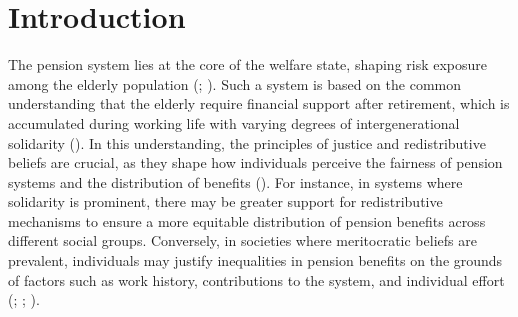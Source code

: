 \documentclass[
  12pt,
]{article}
\begin{document}
\section{Introduction}\label{introduction}

The pension system lies at the core of the welfare state, shaping risk
exposure among the elderly population
(;
). Such
a system is based on the common understanding that the elderly require
financial support after retirement, which is accumulated during working
life with varying degrees of intergenerational solidarity
(). In this understanding,
the principles of justice and redistributive beliefs are crucial, as
they shape how individuals perceive the fairness of pension systems and
the distribution of benefits
(). For
instance, in systems where solidarity is prominent, there may be greater
support for redistributive mechanisms to ensure a more equitable
distribution of pension benefits across different social groups.
Conversely, in societies where meritocratic beliefs are prevalent,
individuals may justify inequalities in pension benefits on the grounds
of factors such as work history, contributions to the system, and
individual effort (; ;
).
\end{document}
